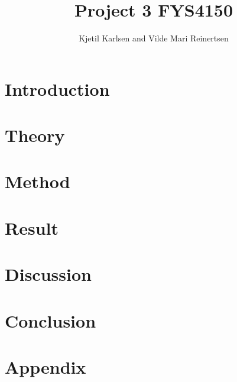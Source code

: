 

\title{Project 3 FYS4150}
\author{Kjetil Karlsen and Vilde Mari Reinertsen}
\raggedbottom



\maketitle

\begin{abstract}







  
\tableofcontents
\end{abstract}

\twocolumn

\section{Introduction}


\section{Theory}


\section{Method}


\section{Result}


\section{Discussion}


\section{Conclusion}






\section*{Appendix}




